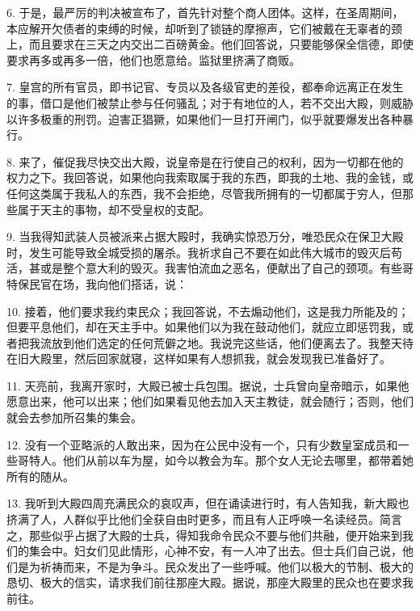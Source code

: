6. 于是，最严厉的判决被宣布了，首先针对整个商人团体。这样，在圣周期间，本应解开欠债者的束缚的时候，却听到了锁链的摩擦声，它们被戴在无辜者的颈上，而且要求在三天之内交出二百磅黄金。他们回答说，只要能够保全信德，即使要求再多或再多一倍，他们也愿意给。监狱里挤满了商贩。\par

7. 皇宫的所有官员，即书记官、专员以及各级官吏的差役，都奉命远离正在发生的事，借口是他们被禁止参与任何骚乱；对于有地位的人，若不交出大殿，则威胁以许多极重的刑罚。迫害正猖獗，如果他们一旦打开闸门，似乎就要爆发出各种暴行。\par

8. 来了，催促我尽快交出大殿，说皇帝是在行使自己的权利，因为一切都在他的权力之下。我回答说，如果他向我索取属于我的东西，即我的土地、我的金钱，或任何这类属于我私人的东西，我不会拒绝，尽管我所拥有的一切都属于穷人，但那些属于天主的事物，却不受皇权的支配。\par

9. 当我得知武装人员被派来占据大殿时，我确实惊恐万分，唯恐民众在保卫大殿时，发生可能导致全城受损的屠杀。我祈求自己不要在如此伟大城市的毁灭后苟活，甚或是整个意大利的毁灭。我害怕流血之恶名，便献出了自己的颈项。有些哥特保民官在场，我向他们搭话，说：\par

10. 接着，他们要求我约束民众；我回答说，不去煽动他们，这是我力所能及的；但要平息他们，却在天主手中。如果他们以为我在鼓动他们，就应立即惩罚我，或者把我流放到他们选定的任何荒僻之地。我说完这些话，他们便离去了。我整天待在旧大殿里，然后回家就寝，这样如果有人想抓我，就会发现我已准备好了。\par

11. 天亮前，我离开家时，大殿已被士兵包围。据说，士兵曾向皇帝暗示，如果他愿意出来，他可以出来；他们如果看见他去加入天主教徒，就会随行；否则，他们就会去参加所召集的集会。\par

12. 没有一个亚略派的人敢出来，因为在公民中没有一个，只有少数皇室成员和一些哥特人。他们从前以车为屋，如今以教会为车。那个女人无论去哪里，都带着她所有的随从。\par

13. 我听到大殿四周充满民众的哀叹声，但在诵读进行时，有人告知我，新大殿也挤满了人，人群似乎比他们全获自由时更多，而且有人正呼唤一名读经员。简言之，那些似乎占据了大殿的士兵，得知我命令民众不要与他们共融，便开始来到我们的集会中。妇女们见此情形，心神不安，有一人冲了出去。但士兵们自己说，他们是为祈祷而来，不是为争斗。民众发出了一些呼喊。他们以极大的节制、极大的恳切、极大的信实，请求我们前往那座大殿。据说，那座大殿里的民众也在要求我前往。\par

